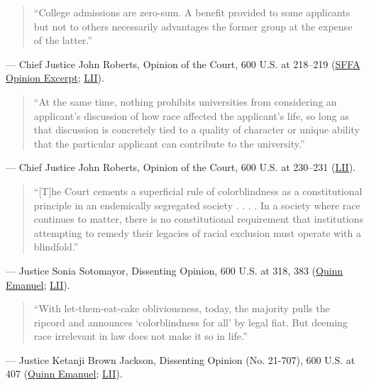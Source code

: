 \documentclass[12pt]{article}
\begin{document}
\begin{quote}
``College admissions are zero-sum. A benefit provided to some applicants but not to others necessarily advantages the former group at the expense of the latter.''
\end{quote}
\noindent --- Chief Justice John Roberts, Opinion of the Court, 600 U.S. at 218--219 (\href{https://tikvah.org/wp-content/uploads/2026/05/Students-for-Fair-Admissions.pdf}{SFFA Opinion Excerpt}; \href{https://www.law.cornell.edu/supremecourt/text/20-1199}{LII}).

\begin{quote}
``At the same time, nothing prohibits universities from considering an applicant's discussion of how race affected the applicant's life, so long as that discussion is concretely tied to a quality of character or unique ability that the particular applicant can contribute to the university.''
\end{quote}
\noindent --- Chief Justice John Roberts, Opinion of the Court, 600 U.S. at 230--231 (\href{https://www.law.cornell.edu/supremecourt/text/20-1199}{LII}).

\begin{quote}
``[T]he Court cements a superficial rule of colorblindness as a constitutional principle in an endemically segregated society . . . . In a society where race continues to matter, there is no constitutional requirement that institutions attempting to remedy their legacies of racial exclusion must operate with a blindfold.''
\end{quote}
\noindent --- Justice Sonia Sotomayor, Dissenting Opinion, 600 U.S. at 318, 383 (\href{https://www.quinnemanuel.com/the-firm/publications/the-road-ahead-fostering-diversity-after-the-supreme-court-s-decision-overturning-affirmative-action-in-university-admissions/}{Quinn Emanuel}; \href{https://www.law.cornell.edu/supremecourt/text/20-1199}{LII}).

\begin{quote}
``With let-them-eat-cake obliviousness, today, the majority pulls the ripcord and announces `colorblindness for all' by legal fiat. But deeming race irrelevant in law does not make it so in life.''
\end{quote}
\noindent --- Justice Ketanji Brown Jackson, Dissenting Opinion (No. 21-707), 600 U.S. at 407 (\href{https://www.quinnemanuel.com/the-firm/publications/the-road-ahead-fostering-diversity-after-the-supreme-court-s-decision-overturning-affirmative-action-in-university-admissions/}{Quinn Emanuel}; \href{https://www.law.cornell.edu/supremecourt/text/20-1199}{LII}).
\end{document}
